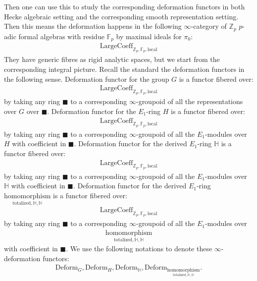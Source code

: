 \documentclass[12pt]{article}
\theoremstyle{definition}
\begin{document}
\indent Then one can use this to study the corresponding deformation functors in both Hecke algebraic setting and the corresponding smooth representation setting. Then this means the deformation happens in the following $\infty$-category of $\mathbb{Z}_p$ $p$-adic formal algebras with residue $\mathbb{F}_p$ by maximal ideals for $\pi_0$:
\begin{align}
\mathrm{LargeCoeff}_{\mathbb{Z}_p,\mathbb{F}_p,\mathrm{local}}
\end{align}
They have generic fibres as rigid analytic spaces, but we start from the corresponding integral picture. Recall the standard the deformation functors in the following sense. Deformation functor for the group $G$ is a functor fibered over:
\begin{align}
\mathrm{LargeCoeff}_{\mathbb{Z}_p,\mathbb{F}_p,\mathrm{local}}
\end{align}
by taking any ring $\blacksquare$ to a corresponding $\infty$-groupoid of all the representations over $G$ over $\blacksquare$. Deformation functor for the $E_1$-ring $H$ is a functor fibered over:
\begin{align}
\mathrm{LargeCoeff}_{\mathbb{Z}_p,\mathbb{F}_p,\mathrm{local}}
\end{align}
by taking any ring $\blacksquare$ to a corresponding $\infty$-groupoid of all the $E_1$-modules over $H$ with coefficient in $\blacksquare$. Deformation functor for the derived $E_1$-ring $\mathbb{H}$ is a functor fibered over:
\begin{align}
\mathrm{LargeCoeff}_{\mathbb{Z}_p,\mathbb{F}_p,\mathrm{local}}
\end{align}
by taking any ring $\blacksquare$ to a corresponding $\infty$-groupoid of all the $E_1$-modules over $\mathbb{H}$ with coefficient in $\blacksquare$. Deformation functor for the derived $E_1$-ring $\underset{{\mathrm{totalized},\mathbb{H},\mathbb{H}}}{\mathrm{homomorphism}}$ is a functor fibered over:
\begin{align}
\mathrm{LargeCoeff}_{\mathbb{Z}_p,\mathbb{F}_p,\mathrm{local}}
\end{align}
by taking any ring $\blacksquare$ to a corresponding $\infty$-groupoid of all the $E_1$-modules over 
\begin{align}
\underset{{\mathrm{totalized},\mathbb{H},\mathbb{H}}}{\mathrm{homomorphism}}
\end{align}
with coefficient in $\blacksquare$. We use the following notations to denote these $\infty$-deformation functors:
\begin{align}
\mathrm{Deform}_{G}, \mathrm{Deform}_H, \mathrm{Deform}_\mathbb{H}, \mathrm{Deform}_{\underset{{\mathrm{totalized},\mathbb{H},\mathbb{H}}}{\mathrm{homomorphism}}}.
\end{align}
\end{document}
